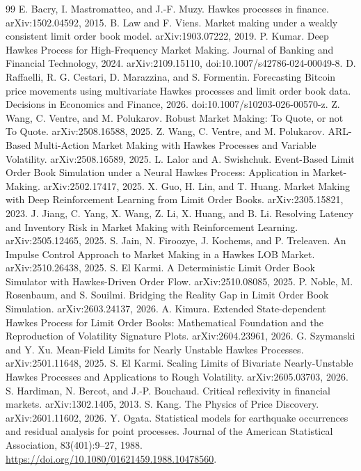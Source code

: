 \documentclass[11pt]{article}
\begin{document}
\begin{thebibliography}{99}
 E. Bacry, I. Mastromatteo, and J.-F. Muzy. Hawkes
processes in finance. arXiv:1502.04592, 2015.
 B. Law and F. Viens. Market making under a weakly
consistent limit order book model. arXiv:1903.07222, 2019.
 P. Kumar. Deep Hawkes Process for High-Frequency Market
Making. Journal of Banking and Financial Technology, 2024. arXiv:2109.15110,
doi:10.1007/s42786-024-00049-8.
 D. Raffaelli, R. G. Cestari, D. Marazzina, and
S. Formentin. Forecasting Bitcoin price movements using multivariate Hawkes
processes and limit order book data. Decisions in Economics and Finance, 2026.
doi:10.1007/s10203-026-00570-z.
 Z. Wang, C. Ventre, and M. Polukarov. Robust
Market Making: To Quote, or not To Quote. arXiv:2508.16588, 2025.
 Z. Wang, C. Ventre, and M. Polukarov. ARL-Based
Multi-Action Market Making with Hawkes Processes and Variable Volatility.
arXiv:2508.16589, 2025.
 L. Lalor and A. Swishchuk. Event-Based Limit
Order Book Simulation under a Neural Hawkes Process: Application in
Market-Making. arXiv:2502.17417, 2025.
 X. Guo, H. Lin, and T. Huang. Market Making with
Deep Reinforcement Learning from Limit Order Books. arXiv:2305.15821, 2023.
 J. Jiang, C. Yang, X. Wang, Z. Li, X. Huang, and B. Li.
Resolving Latency and Inventory Risk in Market Making with Reinforcement
Learning. arXiv:2505.12465, 2025.
 S. Jain, N. Firoozye, J. Kochems, and P. Treleaven. An
Impulse Control Approach to Market Making in a Hawkes LOB Market.
arXiv:2510.26438, 2025.
 S. El Karmi. A Deterministic Limit Order Book
Simulator with Hawkes-Driven Order Flow. arXiv:2510.08085, 2025.
 P. Noble, M. Rosenbaum, and S. Souilmi. Bridging the
Reality Gap in Limit Order Book Simulation. arXiv:2603.24137, 2026.
 A. Kimura. Extended State-dependent Hawkes Process for
Limit Order Books: Mathematical Foundation and the Reproduction of Volatility
Signature Plots. arXiv:2604.23961, 2026.
 G. Szymanski and Y. Xu. Mean-Field Limits for
Nearly Unstable Hawkes Processes. arXiv:2501.11648, 2025.
 S. El Karmi. Scaling Limits of Bivariate
Nearly-Unstable Hawkes Processes and Applications to Rough Volatility.
arXiv:2605.03703, 2026.
 S. Hardiman, N. Bercot, and J.-P. Bouchaud. Critical
reflexivity in financial markets. arXiv:1302.1405, 2013.
 S. Kang. The Physics of Price Discovery. arXiv:2601.11602,
2026.
 Y. Ogata. Statistical models for earthquake occurrences
and residual analysis for point processes. Journal of the American Statistical
Association, 83(401):9--27, 1988.
\url{https://doi.org/10.1080/01621459.1988.10478560}.
\end{thebibliography}
\end{document}
